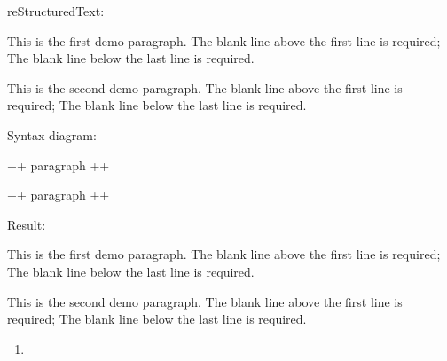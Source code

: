 \documentclass[letterpaper,12pt,english]{sphinxmanual}
\begin{document}
reStructuredText:

\begin{sphinxVerbatim}[commandchars=\\\{\}]
This is the first demo paragraph. The blank line above
the first line is required; The blank line below the last
line is required.

This is the second demo paragraph. The blank line above
the first line is required; The blank line below the last
line is required.
\end{sphinxVerbatim}

Syntax diagram:

\begin{sphinxVerbatim}[commandchars=\\\{\}]
+\PYGZhy{}\PYGZhy{}\PYGZhy{}\PYGZhy{}\PYGZhy{}\PYGZhy{}\PYGZhy{}\PYGZhy{}\PYGZhy{}\PYGZhy{}\PYGZhy{}\PYGZhy{}\PYGZhy{}\PYGZhy{}\PYGZhy{}\PYGZhy{}\PYGZhy{}\PYGZhy{}\PYGZhy{}\PYGZhy{}\PYGZhy{}\PYGZhy{}\PYGZhy{}\PYGZhy{}\PYGZhy{}\PYGZhy{}\PYGZhy{}\PYGZhy{}\PYGZhy{}\PYGZhy{}+
 paragraph                    \textbar{}
                              \textbar{}
+\PYGZhy{}\PYGZhy{}\PYGZhy{}\PYGZhy{}\PYGZhy{}\PYGZhy{}\PYGZhy{}\PYGZhy{}\PYGZhy{}\PYGZhy{}\PYGZhy{}\PYGZhy{}\PYGZhy{}\PYGZhy{}\PYGZhy{}\PYGZhy{}\PYGZhy{}\PYGZhy{}\PYGZhy{}\PYGZhy{}\PYGZhy{}\PYGZhy{}\PYGZhy{}\PYGZhy{}\PYGZhy{}\PYGZhy{}\PYGZhy{}\PYGZhy{}\PYGZhy{}\PYGZhy{}+

+\PYGZhy{}\PYGZhy{}\PYGZhy{}\PYGZhy{}\PYGZhy{}\PYGZhy{}\PYGZhy{}\PYGZhy{}\PYGZhy{}\PYGZhy{}\PYGZhy{}\PYGZhy{}\PYGZhy{}\PYGZhy{}\PYGZhy{}\PYGZhy{}\PYGZhy{}\PYGZhy{}\PYGZhy{}\PYGZhy{}\PYGZhy{}\PYGZhy{}\PYGZhy{}\PYGZhy{}\PYGZhy{}\PYGZhy{}\PYGZhy{}\PYGZhy{}\PYGZhy{}\PYGZhy{}+
 paragraph                    \textbar{}
                              \textbar{}
+\PYGZhy{}\PYGZhy{}\PYGZhy{}\PYGZhy{}\PYGZhy{}\PYGZhy{}\PYGZhy{}\PYGZhy{}\PYGZhy{}\PYGZhy{}\PYGZhy{}\PYGZhy{}\PYGZhy{}\PYGZhy{}\PYGZhy{}\PYGZhy{}\PYGZhy{}\PYGZhy{}\PYGZhy{}\PYGZhy{}\PYGZhy{}\PYGZhy{}\PYGZhy{}\PYGZhy{}\PYGZhy{}\PYGZhy{}\PYGZhy{}\PYGZhy{}\PYGZhy{}\PYGZhy{}+
\end{sphinxVerbatim}

Result:

This is the first demo paragraph. The blank line above the first
line is required; The blank line below the last line is required.

This is the second demo paragraph. The blank line above the first
line is required; The blank line below the last line is required.
\begin{enumerate}
\def\theenumi{\arabic{enumi}}
\def\labelenumi{\theenumi .}
\makeatletter\def\p@enumii{\p@enumi \theenumi .}\makeatother
\setcounter{enumi}{1}
\item {} 

\end{enumerate}
\end{document}

